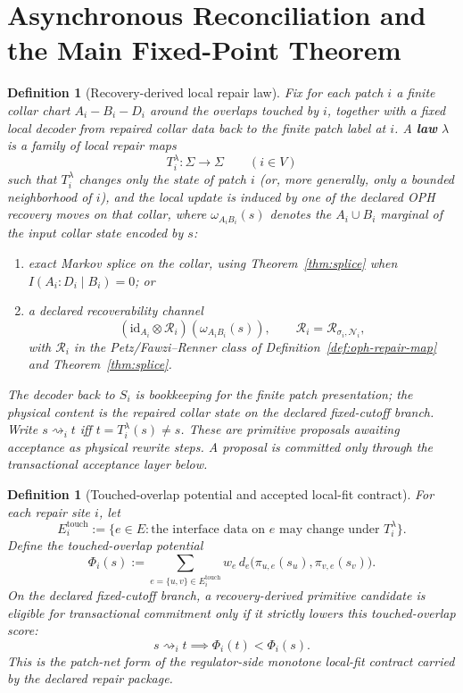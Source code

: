 \documentclass[11pt]{article}
\newtheorem{definition}[theorem]{Definition}
\theoremstyle{remark}
\theoremstyle{plain}
\begin{document}
\section{Asynchronous Reconciliation and the Main Fixed-Point Theorem}

\begin{definition}[Recovery-derived local repair law]\label{def:repair}
Fix for each patch \(i\) a finite collar chart \(A_i\!-\!B_i\!-\!D_i\) around the overlaps touched
by \(i\), together with a fixed local decoder from repaired collar data back to the finite patch
label at \(i\). A \textbf{law} \(\lambda\) is a family of local repair maps
\[
T_i^\lambda:\Sigma\to\Sigma
\qquad (i\in V)
\]
such that \(T_i^\lambda\) changes only the state of patch \(i\) (or, more generally, only a
bounded neighborhood of \(i\)), and the local update is induced by one of the declared OPH
recovery moves on that collar, where \(\omega_{A_iB_i}(s)\) denotes the \(A_i\cup B_i\) marginal
of the input collar state encoded by \(s\):
\begin{enumerate}[label=(\roman*),leftmargin=2em]
\item exact Markov splice on the collar, using Theorem~\ref{thm:splice} when
      \(I(A_i:D_i\mid B_i)=0\); or
\item a declared recoverability channel
\[
(\mathrm{id}_{A_i}\otimes \mathcal R_i)(\omega_{A_iB_i}(s)),
\qquad
\mathcal R_i=\mathcal R_{\sigma_i,\mathcal N_i},
\]
      with \(\mathcal R_i\) in the Petz/Fawzi--Renner class of
      Definition~\ref{def:oph-repair-map} and Theorem~\ref{thm:splice}.
\end{enumerate}
The decoder back to \(S_i\) is bookkeeping for the finite patch presentation; the physical content
is the repaired collar state on the declared fixed-cutoff branch. Write
\(s\rightsquigarrow_i t\) iff \(t=T_i^\lambda(s)\neq s\). These are primitive proposals awaiting
acceptance as physical rewrite steps. A proposal is committed only through the transactional acceptance
layer below.
\end{definition}

\begin{definition}[Touched-overlap potential and accepted local-fit contract]\label{def:localfit}
For each repair site \(i\), let
\[
E_i^{\mathrm{touch}}
:=
\bigl\{
e\in E:\text{the interface data on }e\text{ may change under }T_i^\lambda
\bigr\}.
\]
Define the touched-overlap potential
\[
\Phi_i(s)
:=
\sum_{e=\{u,v\}\in E_i^{\mathrm{touch}}}
w_e\, d_e\!\bigl(\pi_{u,e}(s_u),\pi_{v,e}(s_v)\bigr).
\]
On the declared fixed-cutoff branch, a recovery-derived primitive candidate is eligible for
transactional commitment only if it strictly lowers this touched-overlap score:
\[
s\rightsquigarrow_i t \implies \Phi_i(t)<\Phi_i(s).
\]
This is the patch-net form of the regulator-side monotone local-fit contract carried by the
declared repair package.
\end{definition}
\end{document}
